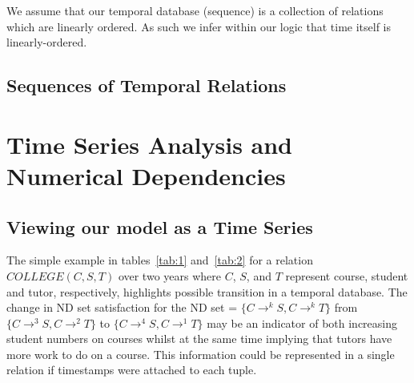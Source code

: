 We assume that our temporal database (sequence) is a collection of
relations which are linearly ordered. As such we infer within our
logic that time itself is linearly-ordered.

\subsection{Sequences of Temporal Relations}


\section{Time Series Analysis and Numerical Dependencies}\label{sec:tl_tsa}

\subsection{Viewing our model as a Time Series}


The simple example in tables~\ref{tab:1} and~\ref{tab:2} for
a relation $COLLEGE(C,S,T)$ over two years where $C$, $S$, and $T$
represent course, student and tutor, respectively, highlights possible
transition in a temporal database. The change in ND set satisfaction
for the ND set = $\{ C \to^k S, C \to^k T \}$ from $\{ C \to^3 S, C \to^2 T \}$
to $\{ C \to^4 S, C \to^1 T \}$ may be an indicator of both increasing
student numbers on courses whilst at the same time implying that
tutors have more work to do on a course. This information could be
represented in a single relation if timestamps were attached to each
tuple.

